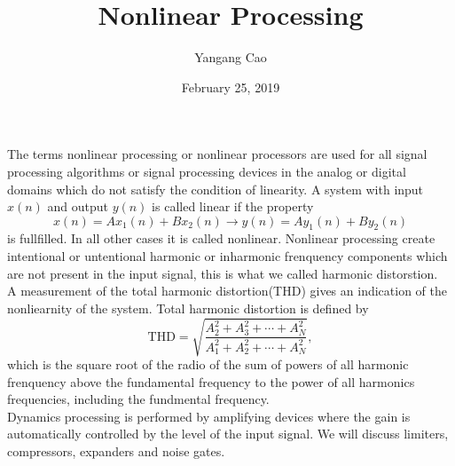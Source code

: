\documentclass[10pt,a4paper,oneside]{article}
\author{Yangang Cao}
\date{February 25, 2019}
\begin{document}
\title{Nonlinear Processing}
\maketitle 

The terms nonlinear processing or nonlinear processors are used for all signal processing algorithms or signal processing devices in the analog or digital domains which do not satisfy the condition of linearity. A system with input $x(n)$ and output $y(n)$ is called 	linear if the property
\[
x(n) = Ax_1(n) + Bx_2(n) \rightarrow y(n) = Ay_1(n) + By_2(n)
\]
is fullfilled. In all other cases it is called nonlinear. Nonlinear processing create intentional or untentional harmonic or inharmonic frenquency components which are not present in the input signal, this is what we called harmonic distorstion.\\

A measurement of the total harmonic distortion(THD) gives an indication of the nonliearnity of the system. Total harmonic distortion is defined by
\[
\mathrm{THD} = \sqrt{\frac{A_2^2 + A_3^2 + \cdots + A_N^2}{A_1^2 + A_2^2 + \cdots + A_N^2}},
\]
which is the square root of the radio of the sum of powers of all harmonic frenquency above the fundamental frequency to the power of all harmonics frequencies, including the fundmental frequency.\\

Dynamics processing is performed by amplifying devices where the gain is automatically controlled by the level of the input signal. We will discuss limiters, compressors, expanders and noise gates. \\
\end{document}
